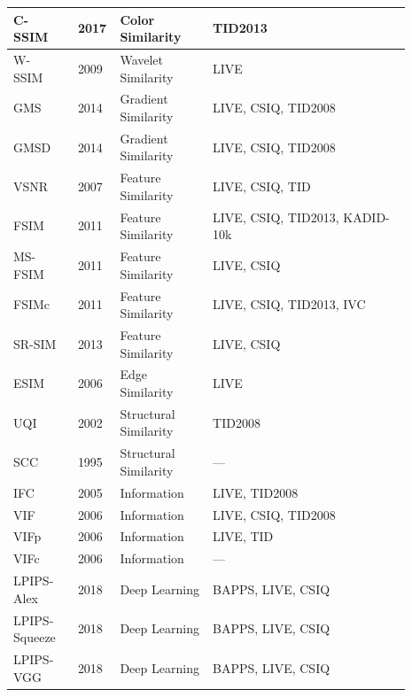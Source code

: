 \begin{longtable}{
p{0.15\linewidth}  %
p{0.05\linewidth}  %
p{0.22\linewidth}  %
p{0.47\linewidth}  %
}
    \acs{C-SSIM}~\cite{hassan2017cssim} & 2017 & Color Similarity & \acs{TID}2013 \\ \hline
    \acs{W-SSIM}~\cite{li2009wssim} & 2009 & Wavelet Similarity & \acs{LIVE} \\ \hline
    \acs{GMS}~\cite{xue2014gmsd} & 2014 & Gradient Similarity & \acs{LIVE}, \acs{CSIQ}, \acs{TID}2008 \\ \hline
    \acs{GMSD}~\cite{xue2014gmsd} & 2014 & Gradient Similarity & \acs{LIVE}, \acs{CSIQ}, \acs{TID}2008 \\ \hline
    \acs{VSNR}~\cite{chandler2007vsnr} & 2007 & Feature Similarity & \acs{LIVE}, \acs{CSIQ}, \acs{TID} \\ \hline
    \acs{FSIM}~\cite{zhang2011fsim} & 2011 & Feature Similarity & \acs{LIVE}, \acs{CSIQ}, \acs{TID}2013,  \acs{KADID-10k} \\ \hline
    \acs{MS-FSIM}~\cite{zhang2011fsim} & 2011 & Feature Similarity & \acs{LIVE}, \acs{CSIQ} \\ \hline
    \acs{FSIMc}~\cite{zhang2011fsim} & 2011 & Feature Similarity & \acs{LIVE}, \acs{CSIQ}, \acs{TID}2013, \acs{IVC} \\ \hline
    \acs{SR-SIM}~\cite{zhang2012srsim} & 2013 & Feature Similarity & \acs{LIVE}, \acs{CSIQ} \\ \hline
    \acs{ESIM}~\cite{chen2006esim} & 2006 & Edge Similarity & \acs{LIVE} \\ \hline
    \acs{UQI}~\cite{wang2002uqi} & 2002 & Structural Similarity & \acs{TID}2008 \\ \hline
    \acs{SCC}~\cite{eskicioglu1995scc} & 1995 & Structural Similarity & --- \\ \hline
    \acs{IFC}~\cite{sheikh2005ifc} & 2005 & Information & \acs{LIVE},  \acs{TID}2008 \\ \hline
    \acs{VIF}~\cite{sheikh2006vif} & 2006 & Information & \acs{LIVE}, \acs{CSIQ}, \acs{TID}2008 \\ \hline
    \acs{VIFp}~\cite{sheikh2006vif} & 2006 & Information & \acs{LIVE}, \acs{TID} \\ \hline
    \acs{VIFc}~\cite{sheikh2006vif} & 2006 & Information & --- \\ \hline
    \acs{LPIPS}-Alex~\cite{zhang2018lpips} & 2018 & Deep Learning & \acs{BAPPS}, \acs{LIVE}, \acs{CSIQ}\\ \hline
    \acs{LPIPS}-Squeeze~\cite{zhang2018lpips} & 2018 & Deep Learning & \acs{BAPPS}, \acs{LIVE}, \acs{CSIQ} \\ \hline
    \acs{LPIPS}-\acs{VGG}~\cite{zhang2018lpips} & 2018 & Deep Learning & \acs{BAPPS}, \acs{LIVE}, \acs{CSIQ}\\ \hline

\end{longtable}
